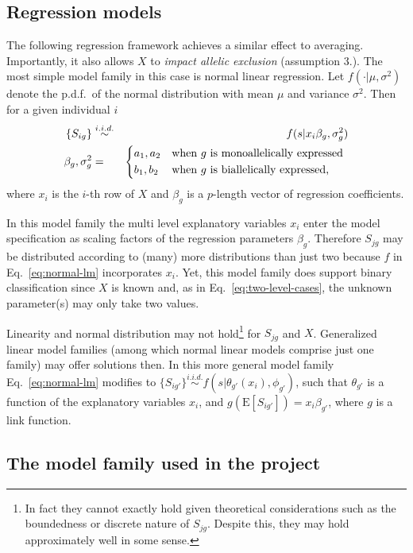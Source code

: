 \documentclass{article}
\begin{document}
\subsection{Regression models}

The following regression framework achieves a similar effect to averaging.
Importantly, it also allows \(X\) to \emph{impact allelic exclusion}
(assumption 3.).  The most simple model family in this case is normal linear
regression.  Let \(f(\cdot|\mu,\sigma^2)\) denote the p.d.f.~of the normal
distribution with mean \(\mu\) and variance \(\sigma^2\).  Then for a given
individual \(i\)
\begin{eqnarray}
\label{eq:normal-lm}
\{S_{ig}\} &\overset{i.i.d.}{\sim}& f(s | x_i \beta_g, \sigma^2_g) \\
\label{eq:shared-regression-param}
\beta_g,\sigma^2_g &=&
\begin{dcases*}
a_1, a_2 & when $g$ is monoallelically expressed \\
b_1, b_2 & when $g$ is biallelically expressed,
\end{dcases*}
\end{eqnarray}
where \(x_i\) is the \(i\)-th row of \(X\) and \(\beta_g\) is a \(p\)-length
vector of regression coefficients.

In this model family the multi level explanatory variables \(x_i\) enter the model specification as
scaling factors of the regression parameters \(\beta_g\).  Therefore \(S_{jg}\) may be distributed
according to (many) more distributions than just two because \(f\) in Eq.~\ref{eq:normal-lm}
incorporates \(x_i\).  Yet, this model family does support binary classification since \(X\) is known
and, as in Eq.~\ref{eq:two-level-cases}, the unknown parameter(s) may only take two values.

Linearity and normal distribution may not hold\footnote{In fact they cannot exactly hold given
theoretical considerations such as the boundedness or discrete nature of \(S_{jg}\).  Despite this,
they may hold approximately well in some sense.} for \(S_{jg}\) and \(X\).  Generalized linear model
families (among which normal linear models comprise just one family) may offer solutions then.  In
this more general model family Eq.~\ref{eq:normal-lm} modifies to \(\{S_{ig'}\}
\overset{i.i.d.}{\sim} f(s | \theta_{g'}(x_i), \phi_{g'})\), such that \(\theta_{g'}\) is a function
of the explanatory variables \(x_i\), and \(g(\mathrm{E}[S_{ig'}]) = x_i \beta_{g'}\), where \(g\)
is a link function.

\subsection{The model family used in the project}
\end{document}
